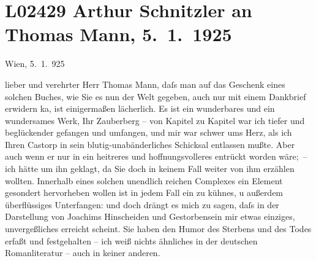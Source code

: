 

\section[Arthur Schnitzler an Thomas Mann, 5. 1. 1925]{L02429 Arthur Schnitzler an Thomas Mann, 5. 1. 1925}
\nopagebreak{}
\rehead{ }\normalsize\beginnumbering{}
\toendnotes[C]{\smallbreak\pagebreak[2]}
\toendnotes[C]{\smallbreak}
\pstart
           \raggedleft{}{\pb}Wien, 5. 1. 925\pend
           
\pstart{}lieber und verehrter Herr Thomas Mann,\pend\vspace{0.5em}
\pstart
           daſs man auf das Geschenk eines solchen Buches, wie Sie es nun der Welt gegeben, auch
               nur mit einem Dankbrief erwidern ka{\geminationn}, ist einigermaßen
               lächerlich. Es ist ein wunderbares und ein wundersames Werk, Ihr Zauberberg – von Kapitel zu Kapitel war ich tiefer und
               beglückender gefangen und umfangen, und mir war schwer ums Herz, als ich Ihren Castorp in sein
               blutig-unabänderliches Schicksal entlassen mußte. Aber auch wenn er nur in ein
               heitreres und hoffnungsvolleres entrückt worden wäre; – ich hätte um ihn geklagt, da
               Sie doch in keinem Fall weiter von ihm erzählen wollten. Innerhalb {\pb}eines solchen unendlich reichen Complexes ein Element gesondert hervorheben wollen
               ist in jedem Fall ein zu kühnes, u außerdem überflüssiges Unterfangen: und doch
               drängt es mich zu sagen, daſs in der Darstellung von Joachims Hinscheiden und Gestorbensein mir etwas einziges,
               unvergeßliches erreicht scheint. Sie haben den Humor des Sterbens und des Todes
               erfaßt und festgehalten – ich weiß nichts ähnliches in der deutschen Romanliteratur –
               auch in keiner anderen.\pend
           
